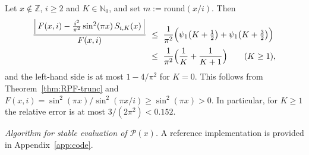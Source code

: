 \begin{corollary}\label{cor:RPF-relative}
Let $x\notin\mathbb Z$, $i\ge 2$ and $K\in\mathbb N_0$, and set $m:=\mathrm{round}(x/i)$. Then
\begin{align*}
\frac{\Bigl|\,F(x,i)-\frac{i^{2}}{\pi^{2}}\sin^{2}(\pi x)\,S_{i,K}(x)\,\Bigr|}{F(x,i)}
&\ \le\ \frac{1}{\pi^{2}}\Bigl(\psi_1\bigl(K+\tfrac12\bigr)+\psi_1\bigl(K+\tfrac32\bigr)\Bigr)\\
&\ \le\ \frac{1}{\pi^{2}}\Bigl(\frac1K+\frac1{K+1}\Bigr)\qquad(K\ge1),
\end{align*}
and the left-hand side is at most $1-4/\pi^{2}$ for $K=0$. This follows from Theorem~\ref{thm:RPF-trunc} and $F(x,i)=\sin^2(\pi x)/\sin^2(\pi x/i)\ge\sin^2(\pi x)>0$. In particular, for $K\ge 1$ the relative error is at most $3/(2\pi^{2})<0.152$.
\end{corollary}


\noindent\textit{Algorithm for stable evaluation of $\mathcal{P}(x)$.} A reference implementation is provided in Appendix~\ref{app:code}.

